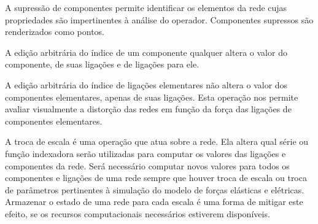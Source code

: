 A supressão de componentes permite identificar os elementos da rede cujas
propriedades são impertinentes à análise do operador. Componentes supressos são
renderizados como pontos.

A edição arbitrária do índice de um componente qualquer altera o valor do
componente, de suas ligações e de ligações para ele.

A edição arbitrária do índice de ligações elementares não altera o valor dos
componentes elementares, apenas de suas ligações.
Esta operação nos permite avaliar visualmente a distorção das redes em função
da força das ligações de componentes elementares.

A troca de escala é uma operação que atua sobre a rede. Ela altera qual série ou
função indexadora serão utilizadas para computar os valores das ligações e
componentes da rede.
Será necessário computar novos valores para todos os componentes e ligações de
uma rede sempre que houver troca de escala ou troca de parâmetros pertinentes à
simulação do modelo de forças elásticas e elétricas.
Armazenar o estado de uma rede para cada escala é uma forma de mitigar este
efeito, se os recursos computacionais necessários estiverem disponíveis.


